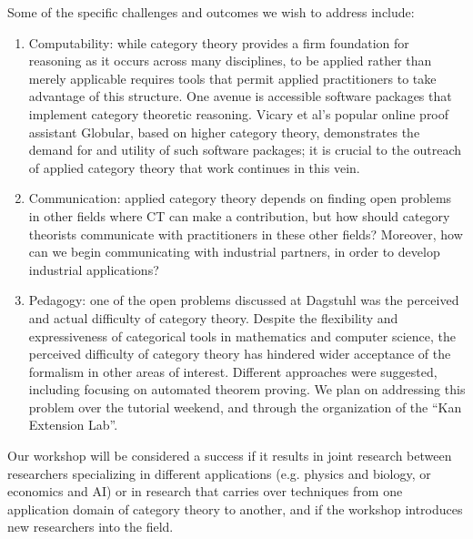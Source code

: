 \documentclass{article}
\newcommand{\redout}[1]{{\color{red}#1}}
\begin{document}
Some of the specific challenges and outcomes we wish to address include:
\begin{enumerate}
  \item Computability: while category theory provides a firm foundation for reasoning as it occurs across many disciplines, to be applied rather than merely applicable requires tools that permit applied practitioners to take advantage of this structure. One avenue is accessible software packages that implement category theoretic reasoning.  Vicary et al's popular online proof assistant Globular, based on higher category theory, demonstrates the demand for and utility of such software packages; it is crucial to the outreach of applied category theory that work continues in this vein.
\item Communication: applied category theory depends on finding open problems in other fields where CT can make a contribution, but how should category theorists communicate with practitioners in these other fields? Moreover, how can we begin communicating with industrial partners, in order to develop industrial applications? %
\item Pedagogy: one of the open problems discussed at Dagstuhl was the perceived and actual difficulty of category theory. Despite the flexibility and expressiveness of categorical tools in mathematics and computer science, the perceived difficulty of category theory has hindered wider acceptance of the formalism in other areas of interest. Different approaches were suggested, including focusing on automated theorem proving. We plan on addressing this problem over the tutorial weekend, and through the organization of the ``Kan Extension Lab''.
\end{enumerate}


Our workshop will be considered a success if it results in joint research between researchers specializing in different applications (e.g. physics and biology, or economics and AI) or in research that carries over techniques from one application domain of category theory to another, and if the workshop introduces new researchers into the field.
\end{document}
